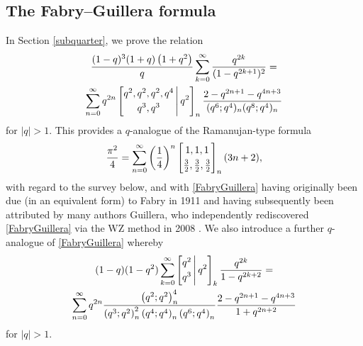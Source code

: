 \documentclass[12pt]{article}
\begin{document}
\subsection{The Fabry--Guillera formula}\label{subFabryGuillera}
 In Section \ref{subquarter}, we prove the relation 
\begin{multline*}
 \frac{(1-q)^3 (1+q) \left(1 + q^2\right)}{q}
 \sum_{k = 0}^{\infty} 
 \frac{q^{2k}}{(1-q^{2k+1})^{2} } = \\ \sum_{n=0}^{\infty} q^{2n} 
 \left[ \begin{matrix} 
 q^{2}, q^{2}, q^{2}, q^{4} \vspace{1mm} \\ 
 q^{3}, q^{3} \end{matrix} \, \Bigg| \, q^{2} \right]_{n} 
 \frac{2-q^{2n+1} - q^{4n+3}}{(q^6;q^4)_{n} (q^8;q^4)_{n}} 
\end{multline*}
 for $|q| > 1$. This provides a $q$-analogue of the Ramanujan-type formula 
\begin{equation}\label{FabryGuillera}
 \frac{\pi^2}{4} = 
 \sum_{n = 0}^{\infty} 
 \left( \frac{1}{4} \right)^{n} \left[ \begin{matrix} 
 1, 1, 1 
 \vspace{1mm} \\ 
 \frac{3}{2}, \frac{3}{2}, \frac{3}{2}
 \end{matrix} \right]_{n} (3 n + 2), 
 \end{equation}
 with regard to the survey below, and 
 with \eqref{FabryGuillera} having originally been due (in an equivalent form) to Fabry in 1911
 \cite[p.\ 129]{Fabry1911} 
 and having subsequently been attributed by many authors Guillera, 
 who independently rediscovered \eqref{FabryGuillera} via the WZ method in 2008 \cite{Guillera2008}. 
 We also introduce a further $q$-analogue of \eqref{FabryGuillera} whereby 
\begin{multline*}
 (1-q) (1-q^2) 
 \sum_{k = 0}^{\infty} 
 \left[ \begin{matrix} 
 q^2 \vspace{1mm} \\ 
 q^{3} \end{matrix} \, \Bigg| \, q^{2} \right]_{k} \frac{q^{2k}}{1-q^{2k+2}} = \\ 
 \sum_{n=0}^{\infty} q^{2n} 
 \frac{ \left( q^2;q^2 \right)_{n}^{4} }{ \left( q^{3};q^{2} \right)_{n}^{2} 
 \left( q^{4};q^{4} \right)_{n} \left( q^{6};q^{4} \right)_{n} }
 \frac{2 - q^{2n+1} - q^{4n+3}}{1 + q^{2n+2}} 
\end{multline*}
 for $|q| > 1$. 
\end{document}
